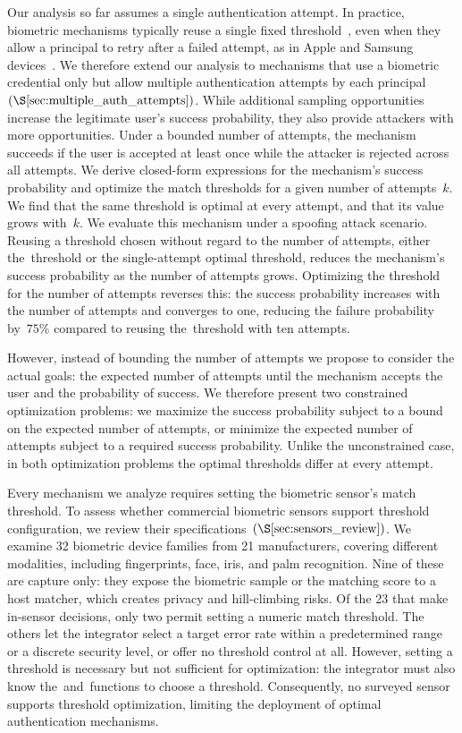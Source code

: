 \documentclass[conference,compsoc]{IEEEtran}
\begin{document}
Our analysis so far assumes a single authentication attempt. In practice, biometric mechanisms typically reuse a single fixed threshold~\cite{biocred_fixed_threshold}, even when they allow a principal to retry after a failed attempt, as in Apple and Samsung devices~\cite{apple_biometric,samsung_biometric}. We therefore extend our analysis to mechanisms that use a biometric credential only but allow multiple authentication attempts by each principal~$(\S\ref{sec:multiple_auth_attempts})$. While additional sampling opportunities increase the legitimate user's success probability, they also provide attackers with more opportunities. Under a bounded number of attempts, the mechanism succeeds if the user is accepted at least once while the attacker is rejected across all attempts. We derive closed-form expressions for the mechanism’s success probability and optimize the match thresholds for a given number of attempts~$k$. We find that the same threshold is optimal at every attempt, and that its value grows with~$k$. We evaluate this mechanism under a spoofing attack scenario. Reusing a threshold chosen without regard to the number of attempts, either the~\EER threshold or the single-attempt optimal threshold, reduces the mechanism's success probability as the number of attempts grows. Optimizing the threshold for the number of attempts reverses this: the success probability increases with the number of attempts and converges to one, reducing the failure probability by~$75\%$ compared to reusing the~\EER threshold with ten attempts.

However, instead of bounding the number of attempts we propose to consider the actual goals: the expected number of attempts until the mechanism accepts the user and the probability of success. We therefore present two constrained optimization problems: we maximize the success probability subject to a bound on the expected number of attempts, or minimize the expected number of attempts subject to a required success probability.
Unlike the unconstrained case, in both optimization problems the optimal thresholds differ at every attempt.

Every mechanism we analyze requires setting the biometric sensor's match threshold.
To assess whether commercial biometric sensors support threshold configuration, we review their specifications~$(\S\ref{sec:sensors_review})$. We examine 32 biometric device families from 21 manufacturers, covering different modalities, including fingerprints, face, iris, and palm recognition. Nine of these are capture only: they expose the biometric sample or the matching score to a host matcher, which creates privacy and hill-climbing risks. Of the 23 that make in-sensor decisions, only two permit setting a numeric match threshold. The others let the integrator select a target error rate within a predetermined range or a discrete security level, or offer no threshold control at all. However, setting a threshold is necessary but not sufficient for optimization: the integrator must also know the~\FAR and~\FRR functions to choose a threshold. Consequently, no surveyed sensor supports threshold optimization, limiting the deployment of optimal authentication mechanisms.
\end{document}
